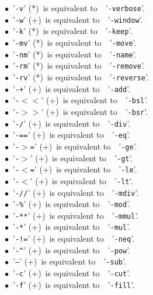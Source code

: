 \documentclass[a4paper,11pt,twoside]{book}
\begin{document}
$\bullet$~'\texttt{-v}' (*)~is equivalent to~~'\texttt{-verbose}'.\\
$\bullet$~'\texttt{-w}' (+)~is equivalent to~~'\texttt{-window}'.\\
$\bullet$~'\texttt{-k}' (*)~is equivalent to~~'\texttt{-keep}'.\\
$\bullet$~'\texttt{-mv}' (*)~is equivalent to~~'\texttt{-move}'.\\
$\bullet$~'\texttt{-nm}' (*)~is equivalent to~~'\texttt{-name}'.\\
$\bullet$~'\texttt{-rm}' (*)~is equivalent to~~'\texttt{-remove}'.\\
$\bullet$~'\texttt{-rv}' (*)~is equivalent to~~'\texttt{-reverse}'.\\
$\bullet$~'\texttt{-+}' (+)~is equivalent to~~'\texttt{-add}'.\\
$\bullet$~'\texttt{-$<$$<$}' (+)~is equivalent to~~'\texttt{-bsl}'.\\
$\bullet$~'\texttt{-$>$$>$}' (+)~is equivalent to~~'\texttt{-bsr}'.\\
$\bullet$~'\texttt{-/}' (+)~is equivalent to~~'\texttt{-div}'.\\
$\bullet$~'\texttt{-==}' (+)~is equivalent to~~'\texttt{-eq}'.\\
$\bullet$~'\texttt{-$>$=}' (+)~is equivalent to~~'\texttt{-ge}'.\\
$\bullet$~'\texttt{-$>$}' (+)~is equivalent to~~'\texttt{-gt}'.\\
$\bullet$~'\texttt{-$<$=}' (+)~is equivalent to~~'\texttt{-le}'.\\
$\bullet$~'\texttt{-$<$}' (+)~is equivalent to~~'\texttt{-lt}'.\\
$\bullet$~'\texttt{-//}' (+)~is equivalent to~~'\texttt{-mdiv}'.\\
$\bullet$~'\texttt{-\%}' (+)~is equivalent to~~'\texttt{-mod}'.\\
$\bullet$~'\texttt{-**}' (+)~is equivalent to~~'\texttt{-mmul}'.\\
$\bullet$~'\texttt{-*}' (+)~is equivalent to~~'\texttt{-mul}'.\\
$\bullet$~'\texttt{-!=}' (+)~is equivalent to~~'\texttt{-neq}'.\\
$\bullet$~'\texttt{-\textasciicircum }' (+)~is equivalent to~~'\texttt{-pow}'.\\
$\bullet$~'\texttt{--}' (+)~is equivalent to~~'\texttt{-sub}'.\\
$\bullet$~'\texttt{-c}' (+)~is equivalent to~~'\texttt{-cut}'.\\
$\bullet$~'\texttt{-f}' (+)~is equivalent to~~'\texttt{-fill}'.\\
\end{document}
